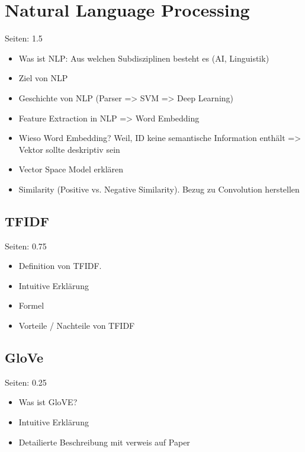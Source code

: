 \documentclass[draft,final,oneside]{vutinfth} %
\begin{document}





\fi


\section{Natural Language Processing}
Seiten: 1.5
\begin{itemize}
\item Was ist NLP: Aus welchen Subdisziplinen besteht es (AI, Linguistik)
\item Ziel von NLP
\item Geschichte von NLP (Parser => SVM => Deep Learning)
\item Feature Extraction in NLP => Word Embedding
\item Wieso Word Embedding? Weil, ID keine semantische Information enthält => Vektor sollte deskriptiv sein
\item Vector Space Model erklären
\item Similarity (Positive vs. Negative Similarity). Bezug zu Convolution herstellen
\end{itemize}

\subsection{TFIDF}
Seiten: 0.75

\begin{itemize}
\item Definition von TFIDF. 
\item Intuitive Erklärung
\item Formel
\item Vorteile / Nachteile von TFIDF
\end{itemize}

\subsection{GloVe}

Seiten: 0.25

\begin{itemize}
\item Was ist GloVE?
\item Intuitive Erklärung
\item Detailierte Beschreibung mit verweis auf Paper
\end{itemize}
\end{document}
